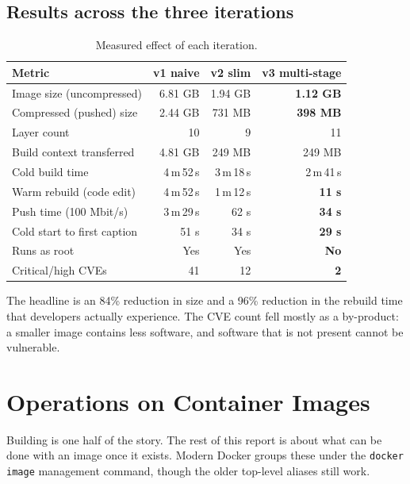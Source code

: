 \documentclass[10pt,a4paper]{article}
\newcommand{\cmd}[1]{\texttt{\small #1}}
\begin{document}
\subsection{Results across the three iterations}

\begin{table}[htbp]
\centering
\caption{Measured effect of each iteration.}
\label{tab:results}
\footnotesize
\begin{tabularx}{\linewidth}{@{}X r r r@{}}
\toprule
\textbf{Metric} & \textbf{v1 naive} & \textbf{v2 slim} & \textbf{v3 multi-stage} \\
\midrule
Image size (uncompressed)  & 6.81 GB & 1.94 GB & \textbf{1.12 GB} \\
Compressed (pushed) size   & 2.44 GB & 731 MB  & \textbf{398 MB} \\
Layer count                & 10      & 9       & 11 \\
Build context transferred  & 4.81 GB & 249 MB  & 249 MB \\
Cold build time            & 4\,m\,52\,s & 3\,m\,18\,s & 2\,m\,41\,s \\
Warm rebuild (code edit)   & 4\,m\,52\,s & 1\,m\,12\,s & \textbf{11 s} \\
Push time (100 Mbit/s)     & 3\,m\,29\,s & 62 s   & \textbf{34 s} \\
Cold start to first caption& 51 s    & 34 s    & \textbf{29 s} \\
Runs as root               & Yes     & Yes     & \textbf{No} \\
Critical/high CVEs         & 41      & 12      & \textbf{2} \\
\bottomrule
\end{tabularx}
\end{table}

The headline is an 84\% reduction in size and a 96\% reduction in the
rebuild time that developers actually experience. The CVE count fell
mostly as a by-product: a smaller image contains less software, and
software that is not present cannot be vulnerable.


\section{Operations on Container Images}

Building is one half of the story. The rest of this report is about what
can be done with an image once it exists. Modern Docker groups these
under the \cmd{docker image} management command, though the older
top-level aliases still work.
\end{document}
